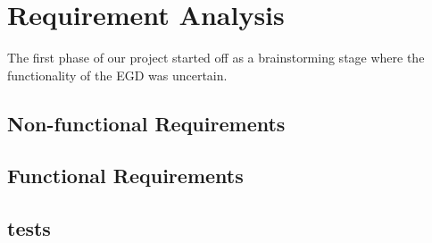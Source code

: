\newpage
\chapter{Requirement Analysis}
    The first phase of our project started off as a brainstorming stage where the functionality
    of the EGD was uncertain.
    \section{Non-functional Requirements}
    \section{Functional Requirements}
\newpage
\section{tests}